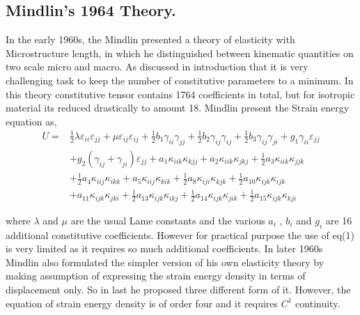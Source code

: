 \documentclass[12pt]{article}
\begin{document}
\subsection{Mindlin's 1964 Theory.}
In the early 1960s, the Mindlin \cite{mindlin1968first} presented a theory of elasticity with Microstructure length, in which he distinguished between kinematic quantities on two scale micro and macro. As discussed in introduction that it is very challenging task to keep the number of constitutive parameters to a minimum. In this theory constitutive tensor contains 1764 coefficients in total, but for isotropic material its reduced drastically to amount 18. Mindlin present the Strain energy equation as,
\begin{equation}\label{first}
\begin{aligned}
U= &\frac{1}{2}\lambda\varepsilon_{ii}\varepsilon_{jj}+\mu\varepsilon_{ij}\varepsilon_{ij}+\frac{1}{2}b_1 \gamma_{ii} \gamma_{jj}+\frac{1}{2}b_2 \gamma_{ij} \gamma_{ij}+\frac{1}{2}b_3 \gamma_{ij} \gamma_{ji}+g_1\gamma_{ii}\varepsilon_{jj}
\\   
&+g_2(\gamma_{ij}+\gamma_{ji})\varepsilon_{jj}+a_1\kappa_{iik}\kappa_{kjj}+a_2\kappa_{iik}\kappa_{jkj}+\frac{1}{2}a_3\kappa_{iik}\kappa_{jjk}
\\
&+\frac{1}{2}a_4\kappa_{iij}\kappa_{ikk}
 +a_5\kappa_{iij}\kappa_{kik}
+\frac{1}{2}a_8\kappa_{iji}\kappa_{kjk}+\frac{1}{2}a_{10}\kappa_{ijk}\kappa_{ijk}
\\
&+a_{11}\kappa_{ijk}\kappa_{jki}+\frac{1}{2}a_{13}\kappa_{ijk}\kappa_{ikj}
+\frac{1}{2}a_{14}\kappa_{ijk}\kappa_{jik}
+\frac{1}{2}a_{15}\kappa_{ijk}\kappa_{kji}
\end{aligned}
\end{equation}  

where $\lambda$ and $\mu$ are the usual Lame constants and the various $a_i$ , $b_i$ and $g_i$ are 16 additional constitutive coefficients. However for practical purpose the use of eq(1) is very limited as it requires so much additional coefficients. In later 1960s Mindlin also formulated the simpler version of his own elasticity theory by making assumption of expressing the strain energy density in terms of displacement only. So in last he proposed three different form of it. However, the equation of strain energy density is of order four and it requires $C^{1}$ continuity.
\newpage
\end{document}
